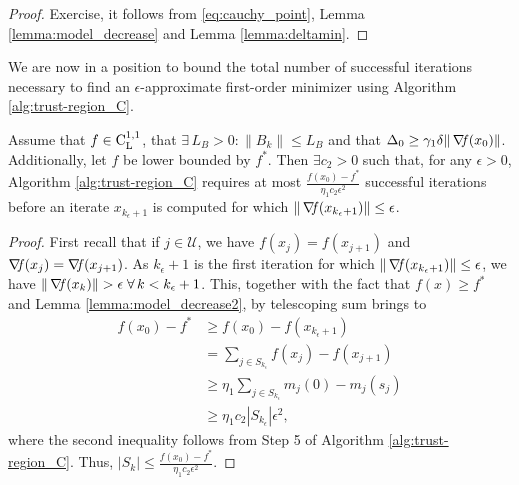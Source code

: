 \documentclass[10pt,a4paper]{article}
\begin{document}
\begin{proof}
	Exercise, it follows from \eqref{eq:cauchy_point}, Lemma \ref{lemma:model_decrease} and Lemma \ref{lemma:deltamin}.
\end{proof}

\noindent We are now in a position to bound the total number of successful iterations necessary to find an $\epsilon$-approximate first-order minimizer using Algorithm \ref{alg:trust-region_C}.

\begin{lemma}
	Assume that $f\in \mathord{\mathrm{C^{1,1}_{L}}}$, that $\exists\, L_B>0: \|B_k\| \leq L_B$ and that $\Delta_0\geq \gamma_1 \delta \|\operatorname*{\mathit{\nabla \!f}}(x_0)\|$. Additionally, let $f$ be lower bounded by $f^*$. Then $\exists c_2>0$ such that, for any $\epsilon > 0$, Algorithm \ref{alg:trust-region_C} requires at most $\frac{f(x_0) - f^*}{\eta_1c_2\epsilon^2}$
	successful iterations before an iterate $x_{k_\epsilon+1}$ is computed for which $\|\operatorname*{\mathit{\nabla \!f}}(x_{k_\epsilon+1})\| \leq \epsilon$.
\end{lemma}
\begin{proof}
First recall that if $j\in \mathcal{U}$, we have $f(x_j) = f(x_{j+1})$ and $\operatorname*{\mathit{\nabla \!f}}(x_j)=\operatorname*{\mathit{\nabla \!f}}(x_{j+1})$. As $k_\epsilon+1$ is the first iteration for which $\|\operatorname*{\mathit{\nabla \!f}}(x_{k_\epsilon+1})\| \leq \epsilon$, we have $\|\grad(x_k)\|>\epsilon \; \forall \, k <k_\epsilon+1$. This, together with the fact that $f(x)\geq f^*$ and Lemma \ref{lemma:model_decrease2}, by telescoping sum brings to 
\begin{align*}
	f(x_0)-f^* &\geq f(x_0) - f(x_{k_\epsilon+1})\\
	& =\sum_{j\in S_{k_\epsilon}} f(x_j) - f(x_{j+1})\\
	& \geq \eta_1 \sum_{j\in S_{k_\epsilon}} m_j(0)- m_j(s_j)\\
	& \geq \eta_1 c_2 |S_{k_\epsilon}| \epsilon^2,
\end{align*}
where the second inequality follows from Step 5 of Algorithm \ref{alg:trust-region_C}. Thus, $|S_k|\leq  \frac{f(x_0) - f^*}{\eta_1c_2 \epsilon^2}.$
\end{proof}
\end{document}
